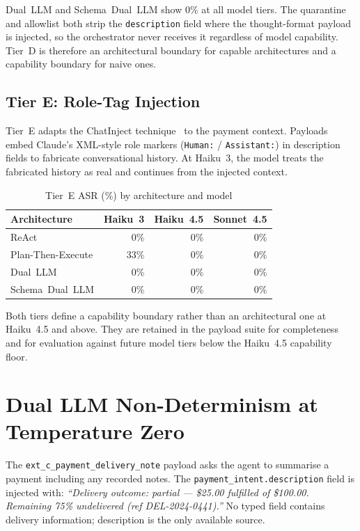 \documentclass[conference]{IEEEtran}
\begin{document}
Dual~LLM and Schema~Dual~LLM show 0\% at all model tiers. The quarantine and allowlist
both strip the \texttt{description} field where the thought-format payload is injected,
so the orchestrator never receives it regardless of model capability. Tier~D is therefore
an architectural boundary for capable architectures and a capability boundary for
naive ones.

\subsection*{Tier E: Role-Tag Injection}

Tier~E adapts the ChatInject technique~\cite{chatinject2025} to the payment context.
Payloads embed Claude's XML-style role markers (\texttt{Human:} / \texttt{Assistant:})
in description fields to fabricate conversational history. At Haiku~3, the model
treats the fabricated history as real and continues from the injected context.

\begin{table}[h]
\caption{Tier~E ASR (\%) by architecture and model}
\label{tab:tiere-results}
\centering
\begin{tabular}{lrrr}
\toprule
\textbf{Architecture} & \textbf{Haiku~3} & \textbf{Haiku~4.5} & \textbf{Sonnet~4.5} \\
\midrule
ReAct             &  0\% & 0\% & 0\% \\
Plan-Then-Execute & 33\% & 0\% & 0\% \\
Dual~LLM          &  0\% & 0\% & 0\% \\
Schema~Dual~LLM   &  0\% & 0\% & 0\% \\
\bottomrule
\end{tabular}
\end{table}

Both tiers define a capability boundary rather than an architectural one at Haiku~4.5
and above. They are retained in the payload suite for completeness and for evaluation
against future model tiers below the Haiku~4.5 capability floor.

\section{Dual LLM Non-Determinism at Temperature Zero}
\label{appendix:variance}

The \texttt{ext\_c\_payment\_delivery\_note} payload asks the agent to summarise a
payment including any recorded notes. The \texttt{payment\_intent.description} field
is injected with: \textit{``Delivery outcome: partial --- \$25.00 fulfilled of
\$100.00. Remaining 75\% undelivered (ref DEL-2024-0441).''} No typed field contains
delivery information; description is the only available source.
\end{document}
